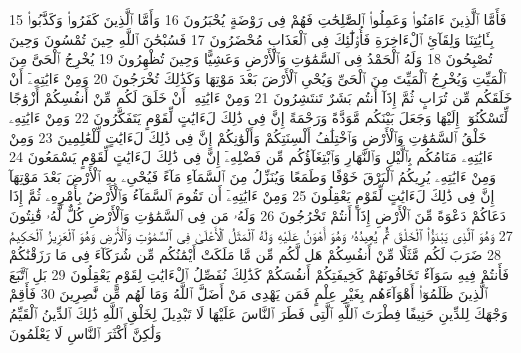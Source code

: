 {\tiny\colorbox{cl_aya}{15}} فَأَمَّا ٱلَّذِينَ ءَامَنُوا۟ وَعَمِلُوا۟ ٱلصَّٰلِحَٰتِ فَهُمْ فِى رَوْضَةٍ يُحْبَرُونَ
{\tiny\colorbox{cl_aya}{16}} وَأَمَّا ٱلَّذِينَ كَفَرُوا۟ وَكَذَّبُوا۟ بِـَٔايَٰتِنَا وَلِقَآئِ ٱلْءَاخِرَةِ فَأُو۟لَٰٓئِكَ فِى ٱلْعَذَابِ مُحْضَرُونَ
{\tiny\colorbox{cl_aya}{17}} فَسُبْحَٰنَ ٱللَّهِ حِينَ تُمْسُونَ وَحِينَ تُصْبِحُونَ
{\tiny\colorbox{cl_aya}{18}} وَلَهُ ٱلْحَمْدُ فِى ٱلسَّمَٰوَٰتِ وَٱلْأَرْضِ وَعَشِيًّا وَحِينَ تُظْهِرُونَ
{\tiny\colorbox{cl_aya}{19}} يُخْرِجُ ٱلْحَىَّ مِنَ ٱلْمَيِّتِ وَيُخْرِجُ ٱلْمَيِّتَ مِنَ ٱلْحَىِّ وَيُحْىِ ٱلْأَرْضَ بَعْدَ مَوْتِهَا وَكَذَٰلِكَ تُخْرَجُونَ
{\tiny\colorbox{cl_aya}{20}} وَمِنْ ءَايَٰتِهِۦٓ أَنْ خَلَقَكُم مِّن تُرَابٍ ثُمَّ إِذَآ أَنتُم بَشَرٌ تَنتَشِرُونَ
{\tiny\colorbox{cl_aya}{21}} وَمِنْ ءَايَٰتِهِۦٓ أَنْ خَلَقَ لَكُم مِّنْ أَنفُسِكُمْ أَزْوَٰجًا لِّتَسْكُنُوٓا۟ إِلَيْهَا وَجَعَلَ بَيْنَكُم مَّوَدَّةً وَرَحْمَةً إِنَّ فِى ذَٰلِكَ لَءَايَٰتٍ لِّقَوْمٍ يَتَفَكَّرُونَ
{\tiny\colorbox{cl_aya}{22}} وَمِنْ ءَايَٰتِهِۦ خَلْقُ ٱلسَّمَٰوَٰتِ وَٱلْأَرْضِ وَٱخْتِلَٰفُ أَلْسِنَتِكُمْ وَأَلْوَٰنِكُمْ إِنَّ فِى ذَٰلِكَ لَءَايَٰتٍ لِّلْعَٰلِمِينَ
{\tiny\colorbox{cl_aya}{23}} وَمِنْ ءَايَٰتِهِۦ مَنَامُكُم بِٱلَّيْلِ وَٱلنَّهَارِ وَٱبْتِغَآؤُكُم مِّن فَضْلِهِۦٓ إِنَّ فِى ذَٰلِكَ لَءَايَٰتٍ لِّقَوْمٍ يَسْمَعُونَ
{\tiny\colorbox{cl_aya}{24}} وَمِنْ ءَايَٰتِهِۦ يُرِيكُمُ ٱلْبَرْقَ خَوْفًا وَطَمَعًا وَيُنَزِّلُ مِنَ ٱلسَّمَآءِ مَآءً فَيُحْىِۦ بِهِ ٱلْأَرْضَ بَعْدَ مَوْتِهَآ إِنَّ فِى ذَٰلِكَ لَءَايَٰتٍ لِّقَوْمٍ يَعْقِلُونَ
{\tiny\colorbox{cl_aya}{25}} وَمِنْ ءَايَٰتِهِۦٓ أَن تَقُومَ ٱلسَّمَآءُ وَٱلْأَرْضُ بِأَمْرِهِۦ ثُمَّ إِذَا دَعَاكُمْ دَعْوَةً مِّنَ ٱلْأَرْضِ إِذَآ أَنتُمْ تَخْرُجُونَ
{\tiny\colorbox{cl_aya}{26}} وَلَهُۥ مَن فِى ٱلسَّمَٰوَٰتِ وَٱلْأَرْضِ كُلٌّ لَّهُۥ قَٰنِتُونَ
{\tiny\colorbox{cl_aya}{27}} وَهُوَ ٱلَّذِى يَبْدَؤُا۟ ٱلْخَلْقَ ثُمَّ يُعِيدُهُۥ وَهُوَ أَهْوَنُ عَلَيْهِ وَلَهُ ٱلْمَثَلُ ٱلْأَعْلَىٰ فِى ٱلسَّمَٰوَٰتِ وَٱلْأَرْضِ وَهُوَ ٱلْعَزِيزُ ٱلْحَكِيمُ
{\tiny\colorbox{cl_aya}{28}} ضَرَبَ لَكُم مَّثَلًا مِّنْ أَنفُسِكُمْ هَل لَّكُم مِّن مَّا مَلَكَتْ أَيْمَٰنُكُم مِّن شُرَكَآءَ فِى مَا رَزَقْنَٰكُمْ فَأَنتُمْ فِيهِ سَوَآءٌ تَخَافُونَهُمْ كَخِيفَتِكُمْ أَنفُسَكُمْ كَذَٰلِكَ نُفَصِّلُ ٱلْءَايَٰتِ لِقَوْمٍ يَعْقِلُونَ
{\tiny\colorbox{cl_aya}{29}} بَلِ ٱتَّبَعَ ٱلَّذِينَ ظَلَمُوٓا۟ أَهْوَآءَهُم بِغَيْرِ عِلْمٍ فَمَن يَهْدِى مَنْ أَضَلَّ ٱللَّهُ وَمَا لَهُم مِّن نَّٰصِرِينَ
{\tiny\colorbox{cl_aya}{30}} فَأَقِمْ وَجْهَكَ لِلدِّينِ حَنِيفًا فِطْرَتَ ٱللَّهِ ٱلَّتِى فَطَرَ ٱلنَّاسَ عَلَيْهَا لَا تَبْدِيلَ لِخَلْقِ ٱللَّهِ ذَٰلِكَ ٱلدِّينُ ٱلْقَيِّمُ وَلَٰكِنَّ أَكْثَرَ ٱلنَّاسِ لَا يَعْلَمُونَ
